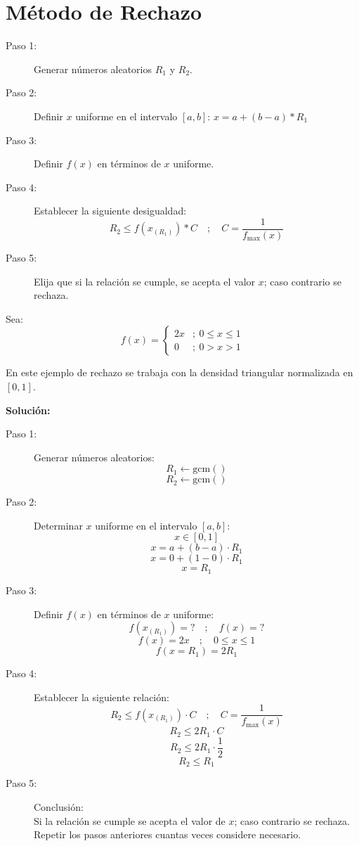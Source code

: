\documentclass{article}
\begin{document}
\section{Método de Rechazo}

\begin{description}
    \item[Paso 1:] Generar números aleatorios $R_1$ y $R_2$.
    \item[Paso 2:] Definir $x$ uniforme en el intervalo $[a,b]$: $x = a+(b-a)*R_1$
    \item[Paso 3:] Definir $f(x)$ en términos de $x$ uniforme.
    \item[Paso 4:] Establecer la siguiente desigualdad:
    $$ R_2 \leq f(x_{(R_1)}) * C \quad ; \quad C = \frac{1}{f_{\max}(x)} $$
    \item[Paso 5:] Elija que si la relación se cumple, se acepta el valor $x$; 
    caso contrario se rechaza.
\end{description}

Sea:
$$f(x)=\begin{cases}2x &;\ 0 \leq x \leq 1 \\ 0 &;\ 0>x>1\end{cases}$$

En este ejemplo de rechazo se trabaja con la densidad triangular normalizada en $[0,1]$.

\textbf{Solución:}
\begin{description}
    \item[Paso 1:] Generar números aleatorios:
    $$ R_1 \leftarrow \text{gcm}() $$
    $$ R_2 \leftarrow \text{gcm}() $$

    \item[Paso 2:] Determinar $x$ uniforme en el intervalo $[a, b]$:
    $$ x \in [0, 1] $$
    $$ x = a + (b-a) \cdot R_1 $$
    $$ x = 0 + (1-0) \cdot R_1 $$
    $$ x = R_1 $$

    \item[Paso 3:] Definir $f(x)$ en términos de $x$ uniforme:
    $$ f(x_{(R_1)}) = ? \quad ; \quad f(x) = ? $$
    $$ f(x) = 2x \quad ; \quad 0 \leq x \leq 1 $$
    $$ f(x = R_1) = 2R_1 $$

    \item[Paso 4:] Establecer la siguiente relación:
    $$ R_2 \leq f(x_{(R_1)}) \cdot C \quad ; \quad C = \frac{1}{f_{\max}(x)} $$
    $$ R_2 \leq 2R_1 \cdot C $$
    $$ R_2 \leq 2R_1 \cdot \frac{1}{2} $$
    $$ R_2 \leq R_1 $$

    \item[Paso 5:] Conclusión:\\
    Si la relación se cumple se acepta el valor de $x$; caso contrario se rechaza. 
    Repetir los pasos anteriores cuantas veces considere necesario.
\end{description}
\end{document}
